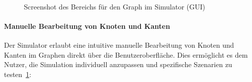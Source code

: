 \documentclass[main.tex]{subfiles} %
\begin{document}
\begin{figure}[H]
  \centering
  \caption{Screenshot des Bereichs für den Graph im Simulator (GUI)}~\label{fig:DashboardGraph}
\end{figure}

\paragraph{Manuelle Bearbeitung von Knoten und Kanten}

Der Simulator erlaubt eine intuitive manuelle Bearbeitung von Knoten
und Kanten im Graphen direkt über die Benutzeroberfläche. Dies
ermöglicht es dem Nutzer, die Simulation individuell anzupassen und
spezifische Szenarien zu testen~\ref{fig:DashboardGraph}:
\end{document}
